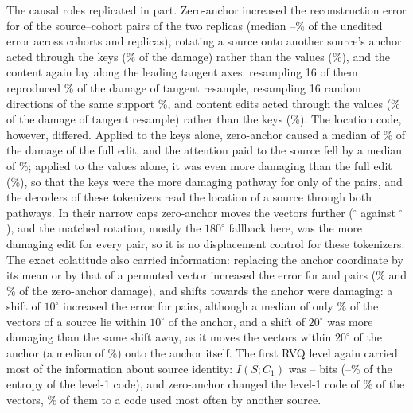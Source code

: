 \documentclass[10pt,letterpaper]{article}
\begin{document}
The causal roles replicated in part. Zero-anchor increased the reconstruction error for
\RepZeroAnchorPositiveCount{} of the \RepSourceCohortPairs{} source--cohort pairs of the two replicas
(median \RepZeroAnchorRelMin--\RepZeroAnchorRelMax\% of the unedited error across cohorts and
replicas), rotating a source onto another source's anchor acted through the keys
(\RepKeysSwapMedianPct\% of the damage) rather than the values (\RepValuesSwapMedianPct\%), and the
content again lay along the leading tangent axes: resampling 16 of them reproduced
\RepShareTPCsixteenMedianPct\% of the damage of tangent resample, resampling 16 random directions of
the same support \RepShareRandsixteenMedianPct\%, and content edits acted through the values
(\RepValuesTangentMedianPct\% of the damage of tangent resample) rather than the keys
(\RepKeysTangentMedianPct\%). The location code, however, differed. Applied to the keys alone,
zero-anchor caused a median of \RepKeysZeroMedianPct\% of the damage of the full edit, and the attention
paid to the source fell by a median of \RepAttnDropMedianPct\%; applied to the values alone, it was even
more damaging than the full edit (\RepValuesZeroMedianPct\%), so that the keys were the more damaging
pathway for only \RepKeysOverValuesZeroCount{} of the \RepSourceCohortPairs{} pairs, and the decoders of these tokenizers read the
location of a source through both pathways. In their narrow caps zero-anchor moves the vectors further
(\RepMatchedDisp$^\circ$ against \MatchedDisp$^\circ$), and the matched rotation, mostly the
$180^\circ$ fallback here, was the more damaging edit for every pair, so it is no displacement control
for these tokenizers. The exact colatitude also carried information: replacing the anchor coordinate
by its mean or by that of a permuted vector increased the error for \RepMeanAnchorPositiveCount{} and
\RepResampleAnchorPositiveCount{} pairs (\RepMeanOverZeroMedianPct\% and \RepResampleOverZeroMedianPct\%
of the zero-anchor damage), and shifts towards the anchor were damaging: a shift of $10^\circ$ increased the error for
\RepColatMTenPositiveCount{} pairs, although a median of only \RepWithinTenMedianPct\% of the vectors of a
source lie within $10^\circ$ of the anchor, and a shift of $20^\circ$ was more damaging than the same
shift away, as it moves the vectors within $20^\circ$ of the anchor (a median of
\RepWithinTwentyMedianPct\%) onto the anchor itself. The first RVQ level
again carried most of the information about source identity: $I(S;C_1)$ was
\RepMILevelOneMin--\RepMILevelOneMax{} bits (\RepMIShareCodeLevelOneMin--\RepMIShareCodeLevelOneMax\%
of the entropy of the level-1 code), and zero-anchor changed the level-1 code of
\RepFlipZeroLevelOne\% of the vectors, \RepForeignZero\% of them to a code used most often by
another source.
\end{document}
